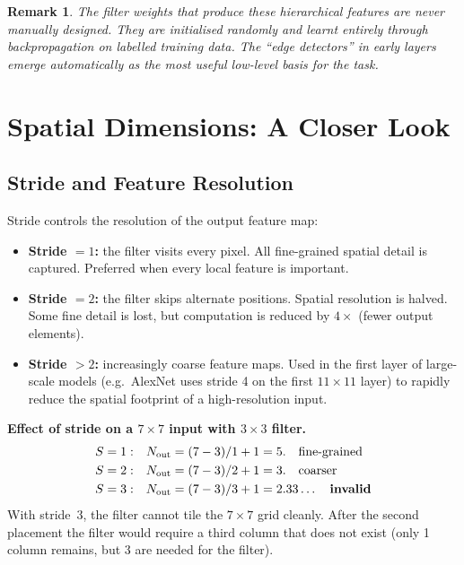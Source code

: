 \documentclass[12pt,a4paper]{article}
\newtheorem{remark}{Remark}[section]
\begin{document}
\begin{remark}
The filter weights that produce these hierarchical features are never
manually designed.  They are initialised randomly and learnt entirely through
backpropagation on labelled training data.  The ``edge detectors'' in early
layers emerge automatically as the most useful low-level basis for the task.
\end{remark}

\section{Spatial Dimensions: A Closer Look}
\label{sec:spatial}

\subsection{Stride and Feature Resolution}
\label{subsec:stride_resolution}

Stride controls the resolution of the output feature map:

\begin{itemize}[leftmargin=2em]
  \item \textbf{Stride $= 1$:} the filter visits every pixel.  All fine-grained
        spatial detail is captured.  Preferred when every local feature is
        important.
  \item \textbf{Stride $= 2$:} the filter skips alternate positions.  Spatial
        resolution is halved.  Some fine detail is lost, but computation is
        reduced by $4\times$ (fewer output elements).
  \item \textbf{Stride $> 2$:} increasingly coarse feature maps.  Used in
        the first layer of large-scale models (e.g.\ AlexNet uses stride 4
        on the first $11\times11$ layer) to rapidly reduce the spatial footprint
        of a high-resolution input.
\end{itemize}

\begin{example}
\textbf{Effect of stride on a $7\times7$ input with $3\times3$ filter.}
\begin{align*}
  S=1: &\quad N_{\text{out}} = (7-3)/1 + 1 = 5. \quad \text{fine-grained} \\
  S=2: &\quad N_{\text{out}} = (7-3)/2 + 1 = 3. \quad \text{coarser} \\
  S=3: &\quad N_{\text{out}} = (7-3)/3 + 1 = 2.33\ldots \quad
              \text{\textbf{invalid}} \\
\end{align*}
With stride~3, the filter cannot tile the $7\times7$ grid cleanly.  After the
second placement the filter would require a third column that does not exist
(only 1 column remains, but 3 are needed for the filter).
\end{example}
\end{document}
